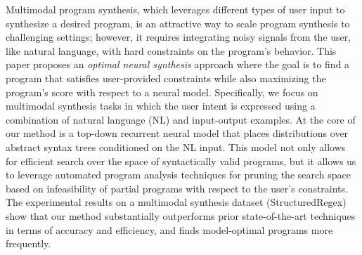Multimodal program synthesis, which leverages different types of user input to synthesize a desired program, is an attractive way to scale program synthesis to challenging settings; however, it requires integrating noisy signals from the user, like natural language, with hard constraints on the program's behavior. This paper proposes an \emph{optimal neural synthesis} approach where the goal is to find a program that satisfies user-provided constraints while also maximizing the program's score with respect to a neural model. Specifically, we focus on multimodal synthesis tasks in which the user intent is expressed using a combination of natural language (NL) and input-output examples. At the core of our method is a top-down recurrent neural model that places distributions over abstract syntax trees conditioned on the NL input. This model not only allows for efficient search over the space of syntactically valid programs, but it allows us to leverage automated program analysis techniques for pruning the search space based on infeasibility of partial programs with respect to the user's constraints. The experimental results on a multimodal synthesis dataset (StructuredRegex) show that our method substantially outperforms prior state-of-the-art techniques in terms of accuracy and efficiency, and finds model-optimal programs more frequently.
